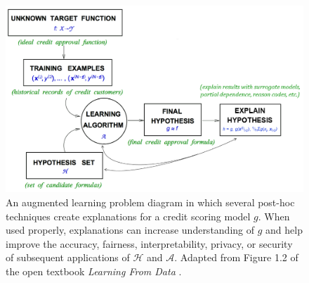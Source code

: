 \documentclass[fleqn]{article}
\begin{document}

\begin{figure}[htb]
	\begin{center}
		\includegraphics[scale=0.33]{img/figure_1.png}
		\caption{An augmented learning problem diagram in which several post-hoc techniques create explanations for a credit scoring model $g$. When used properly, explanations can increase understanding of $g$ and help improve the accuracy, fairness, interpretability, privacy, or security of subsequent applications of $\mathcal{H}$ and $\mathcal{A}$. Adapted from Figure 1.2 of the open textbook \textit{Learning From Data} \cite{lfd}.}
		\label{fig:learning_problem}
	\end{center}
\end{figure}	
\end{document}
